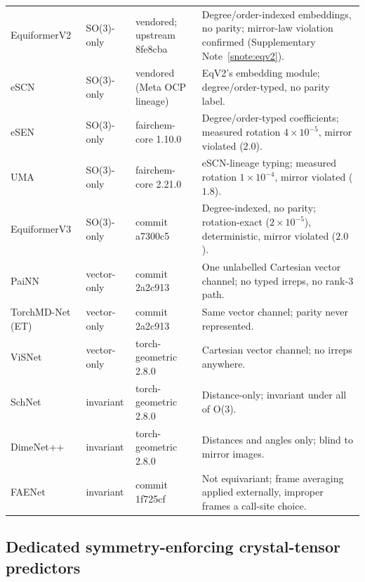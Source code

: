 \begin{longtable}{@{}>{\raggedright\arraybackslash}p{} l >{\raggedright\arraybackslash}p{} >{\raggedright\arraybackslash}p{}@{}}
EquiformerV2 & SO(3)-only & vendored; upstream 8fe8cba & Degree/order-indexed embeddings, no parity; mirror-law violation confirmed (Supplementary Note~\ref{snote:eqv2}). \\
eSCN & SO(3)-only & vendored (Meta OCP lineage) & EqV2's embedding module; degree/order-typed, no parity label. \\
eSEN~\cite{fu2025esen} & SO(3)-only & fairchem-core 1.10.0 & Degree/order-typed coefficients; measured rotation $4\times10^{-5}$, mirror violated ($2.0$). \\
UMA~\cite{wood2025uma} & SO(3)-only & fairchem-core 2.21.0 & eSCN-lineage typing; measured rotation $1\times10^{-4}$, mirror violated ($1.8$). \\
EquiformerV3 \cite{equiformerv3} & SO(3)-only & commit a7300c5 & Degree-indexed, no parity; rotation-exact ($2\times10^{-5}$), deterministic, mirror violated ($2.0$). \\
\midrule
PaiNN~\cite{schutt2021painn} & vector-only & commit 2a2c913 & One unlabelled Cartesian vector channel; no typed irreps, no rank-3 path. \\
TorchMD-Net (ET)~\cite{tholke2022torchmdnet} & vector-only & commit 2a2c913 & Same vector channel; parity never represented. \\
ViSNet~\cite{wang2024visnet} & vector-only & torch-geometric 2.8.0 & Cartesian vector channel; no irreps anywhere. \\
\midrule
SchNet~\cite{schutt2017schnet} & invariant & torch-geometric 2.8.0 & Distance-only; invariant under all of O(3). \\
DimeNet++~\cite{gasteiger2020dimenetpp} & invariant & torch-geometric 2.8.0 & Distances and angles only; blind to mirror images. \\
FAENet~\cite{duval2023faenet} & invariant & commit 1f725cf & Not equivariant; frame averaging applied externally, improper frames a call-site choice. \\
\end{longtable}
\endgroup


\label{snote:sota}

\subsection*{Dedicated symmetry-enforcing crystal-tensor predictors}

